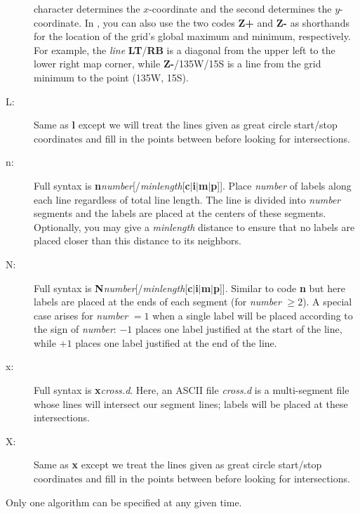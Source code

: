 \begin{description}
character determines the $x$-coordinate and the second determines the $y$-coordinate.  In ,
you can also use the two codes {\bf Z+} and {\bf Z-} as shorthands for the location of the grid's global
maximum and minimum, respectively.  For example, the {\it line} {\bf LT}/{\bf RB} is a diagonal from the
upper left to the lower right map corner, while {\bf Z-}/135W/15S is a line from the grid minimum to the point
(135\DS W, 15\DS S).
\item [L:] Same as {\bf l} except we will treat the lines given as great circle start/stop coordinates and fill in
the points between before looking for intersections.
\item [n:] Full syntax is {\bf n}{\it number}[/{\it minlength}[{\bf c$|$i$|$m$|$p}]].  Place
{\it number} of labels along each line regardless of total line length.  The line is divided into {\it number}
segments and the labels are placed at the centers of these segments.  Optionally, you may give a {\it minlength}
distance to ensure that no labels are placed closer than this distance to its neighbors.
\item [N:] Full syntax is {\bf N}{\it number}[/{\it minlength}[{\bf c$|$i$|$m$|$p}]].  Similar to
code {\bf n} but here labels are placed at the ends of each segment (for {\it number} $\geq 2$).  A special
case arises for {\it number} $= 1$ when a single label will be placed according to the sign of {\it number}:
$-1$ places one label justified at the start of the line, while $+1$ places one label justified at the end of the line.
\item [x:] Full syntax is {\bf x}{\it cross.d}.  Here, an ASCII file {\it cross.d} is
a multi-segment file whose lines will intersect our segment lines; labels will be placed at these intersections.
\item [X:] Same as {\bf x} except we treat the lines given as great circle start/stop coordinates and fill in the
points between before looking for intersections.
\end{description}
Only one algorithm can be specified at any given time.

